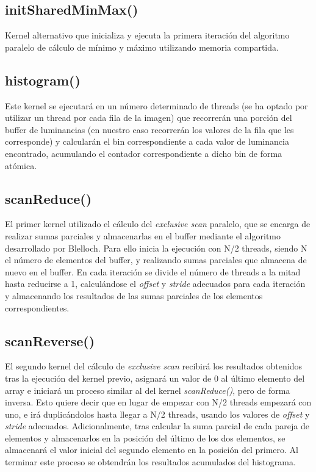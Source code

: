 \documentclass[10pt,oneside,a4paper]{article}
\begin{document}
\subsection{initSharedMinMax()}
Kernel alternativo que inicializa y ejecuta la primera iteración del algoritmo paralelo de cálculo de mínimo y máximo utilizando memoria compartida.

\subsection{histogram()}
Este kernel se ejecutará en un número determinado de threads (se ha optado por utilizar un thread por cada fila de la imagen) que recorrerán una porción del buffer de luminancias (en nuestro caso recorrerán los valores de la fila que les corresponde) y calcularán el bin correspondiente a cada valor de luminancia encontrado, acumulando el contador correspondiente a dicho bin de forma atómica.

\subsection{scanReduce()}
El primer kernel utilizado el cálculo del \textit{exclusive scan} paralelo, que se encarga de realizar sumas parciales y almacenarlas en el buffer mediante el algoritmo desarrollado por Blelloch. Para ello inicia la ejecución con N/2 threads, siendo N el número de elementos del buffer, y realizando sumas parciales que almacena de nuevo en el buffer. En cada iteración se divide el número de threads a la mitad hasta reducirse a 1, calculándose el \emph{offset} y \emph{stride} adecuados para cada iteración y almacenando los resultados de las sumas parciales de los elementos correspondientes. 

\subsection{scanReverse()}
El segundo kernel del cálculo de \textit{exclusive scan} recibirá los resultados obtenidos tras la ejecución del kernel previo, asignará un valor de 0 al último elemento del array e iniciará un proceso similar al del kernel \textit{scanReduce()}, pero de forma inversa. Esto quiere decir que en lugar de empezar con N/2 threads empezará con uno, e irá duplicándolos hasta llegar a N/2 threads, usando los valores de \emph{offset} y \emph{stride} adecuados. Adicionalmente, tras calcular la suma parcial de cada pareja de elementos y almacenarlos en la posición del último de los dos elementos, se almacenará el valor inicial del segundo elemento en la posición del primero. Al terminar este proceso se obtendrán los resultados acumulados del histograma.
\end{document}

